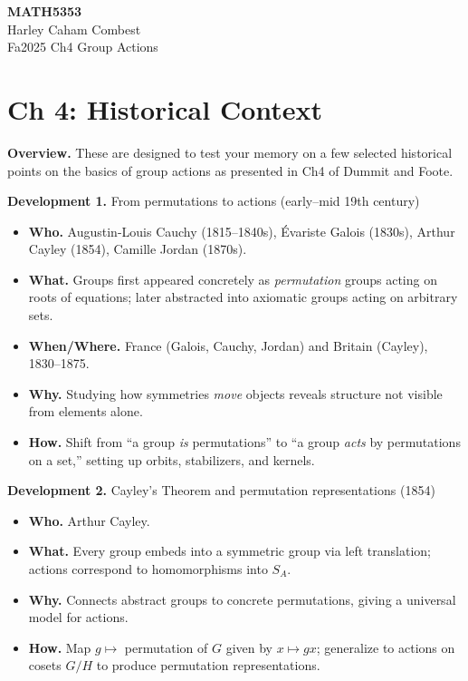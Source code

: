 \documentclass[12pt]{article}
\theoremstyle{definition}
\begin{document}
\begin{center}
\Large\textbf{MATH5353} \\
\large Harley Caham Combest \\
\large Fa2025 Ch4 Group Actions
\end{center}

\newpage

\dotfill
\section*{Ch 4: Historical Context}
\dotfill


\newpage


\noindent \textbf{Overview.} These are designed to test your memory on a few selected historical points on the basics of group actions as presented in Ch4 of Dummit and Foote.

\newpage

\textbf{Development 1.} From permutations to actions (early–mid 19th century)

\newpage

\begin{itemize}
  \item \textbf{Who.} Augustin-Louis Cauchy (1815–1840s), Évariste Galois (1830s), Arthur Cayley (1854), Camille Jordan (1870s). 
  \item \textbf{What.} Groups first appeared concretely as \emph{permutation} groups acting on roots of equations; later abstracted into axiomatic groups acting on arbitrary sets.
  \item \textbf{When/Where.} France (Galois, Cauchy, Jordan) and Britain (Cayley), 1830–1875.
  \item \textbf{Why.} Studying how symmetries \emph{move} objects reveals structure not visible from elements alone.
  \item \textbf{How.} Shift from “a group \emph{is} permutations” to “a group \emph{acts} by permutations on a set,” setting up orbits, stabilizers, and kernels.
\end{itemize}

\newpage

\textbf{Development 2.} Cayley’s Theorem and permutation representations (1854)

\newpage

\begin{itemize}
  \item \textbf{Who.} Arthur Cayley.
  \item \textbf{What.} Every group embeds into a symmetric group via left translation; actions correspond to homomorphisms into $S_A$.
  \item \textbf{Why.} Connects abstract groups to concrete permutations, giving a universal model for actions.
  \item \textbf{How.} Map $g \mapsto$ permutation of $G$ given by $x \mapsto gx$; generalize to actions on cosets $G/H$ to produce permutation representations.
\end{itemize}
\end{document}
